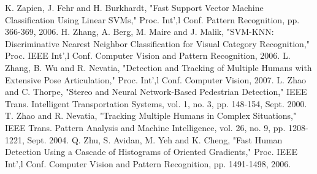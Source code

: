 \documentclass[10pt,letterpaper,journal,compsoc]{IEEEtran}
\begin{document}
\begin{thebibliography}{99}
K. Zapien, J. Fehr and H. Burkhardt, "Fast Support Vector Machine Classification Using Linear SVMs," Proc. Int',l Conf. Pattern Recognition, pp. 366-369, 2006. 
H. Zhang, A. Berg, M. Maire and J. Malik, "SVM-KNN: Discriminative Nearest Neighbor Classification for Visual Category Recognition," Proc. IEEE Int',l Conf. Computer Vision and Pattern Recognition, 2006. 
L. Zhang, B. Wu and R. Nevatia, "Detection and Tracking of Multiple Humans with Extensive Pose Articulation," Proc. Int',l Conf. Computer Vision, 2007. 
L. Zhao and C. Thorpe, "Stereo and Neural Network-Based Pedestrian Detection," IEEE Trans. Intelligent Transportation Systems, vol. 1, no. 3, pp. 148-154, Sept. 2000. 
T. Zhao and R. Nevatia, "Tracking Multiple Humans in Complex Situations," IEEE Trans. Pattern Analysis and Machine Intelligence, vol. 26, no. 9, pp. 1208-1221, Sept. 2004. 
Q. Zhu, S. Avidan, M. Yeh and K. Cheng, "Fast Human Detection Using a Cascade of Histograms of Oriented Gradients," Proc. IEEE Int',l Conf. Computer Vision and Pattern Recognition, pp. 1491-1498, 2006. 
\end{thebibliography}
\end{document}
